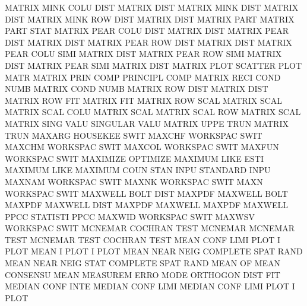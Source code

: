MATRIX   MINK COLU DIST                 MATRIX   DIST
MATRIX   MINK DIST                      MATRIX   DIST
MATRIX   MINK ROW  DIST                 MATRIX   DIST
MATRIX   PART                           MATRIX   PART STAT
MATRIX   PEAR COLU DIST                 MATRIX   DIST
MATRIX   PEAR DIST                      MATRIX   DIST
MATRIX   PEAR ROW  DIST                 MATRIX   DIST
MATRIX   PEAR COLU SIMI                 MATRIX   DIST
MATRIX   PEAR ROW  SIMI                 MATRIX   DIST
MATRIX   PEAR SIMI                      MATRIX   DIST
MATRIX   PLOT                           SCATTER  PLOT MATR
MATRIX   PRIN COMP                      PRINCIPL COMP
MATRIX   RECI COND NUMB                 MATRIX   COND NUMB
MATRIX   ROW  DIST                      MATRIX   DIST
MATRIX   ROW  FIT                       MATRIX   FIT
MATRIX   ROW  SCAL                      MATRIX   SCAL
MATRIX   SCAL COLU                      MATRIX   SCAL
MATRIX   SCAL ROW                       MATRIX   SCAL
MATRIX   SING VALU                      SINGULAR VALU
MATRIX   UPPE TRUN                      MATRIX   TRUN
MAXARG                                  HOUSEKEE SWIT
MAXCHF                                  WORKSPAC SWIT
MAXCHM                                  WORKSPAC SWIT
MAXCOL                                  WORKSPAC SWIT
MAXFUN                                  WORKSPAC SWIT
MAXIMIZE                                OPTIMIZE
MAXIMUM  LIKE ESTI                      MAXIMUM  LIKE
MAXIMUM  COUN STAN INPU                 STANDARD INPU
MAXNAM                                  WORKSPAC SWIT
MAXNK                                   WORKSPAC SWIT
MAXN                                    WORKSPAC SWIT
MAXWELL  BOLT DIST                      MAXPDF
MAXWELL  BOLT                           MAXPDF
MAXWELL  DIST                           MAXPDF
MAXWELL                                 MAXPDF
MAXWELL  PPCC                           STATISTI PPCC
MAXWID                                  WORKSPAC SWIT
MAXWSV                                  WORKSPAC SWIT
MCNEMAR                                 COCHRAN  TEST
MCNEMAR                                 MCNEMAR  TEST
MCNEMAR  TEST                           COCHRAN  TEST
MEAN     CONF LIMI PLOT                 I        PLOT
MEAN     I    PLOT                      I        PLOT
MEAN     NEAR NEIG                      COMPLETE SPAT RAND
MEAN     NEAR NEIG STAT                 COMPLETE SPAT RAND
MEAN     OF   MEAN                      CONSENSU MEAN
MEASUREM ERRO MODE                      ORTHOGON DIST FIT
MEDIAN   CONF INTE                      MEDIAN   CONF LIMI
MEDIAN   CONF LIMI PLOT                 I        PLOT
